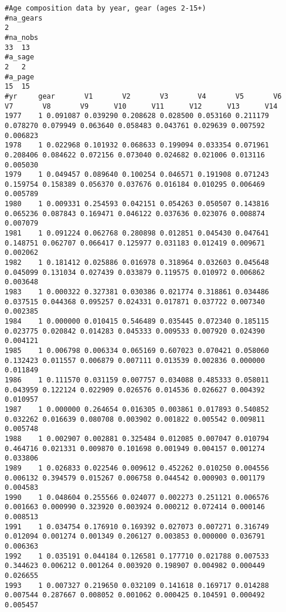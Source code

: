 \begin{landscape}
\begin{footnotesize}
\begin{verbatim}
#Age composition data by year, gear (ages 2-15+)
#na_gears
2
#na_nobs
33	13
#a_sage
2	2
#a_page
15	15
#yr 	gear       V1       V2       V3       V4       V5       V6       V7       V8       V9      V10      V11      V12      V13      V14
1977    1 0.091087 0.039290 0.208628 0.028500 0.053160 0.211179 0.078270 0.079949 0.063640 0.058483 0.043761 0.029639 0.007592 0.006823
1978    1 0.022968 0.101932 0.068633 0.199094 0.033354 0.071961 0.208406 0.084622 0.072156 0.073040 0.024682 0.021006 0.013116 0.005030
1979    1 0.049457 0.089640 0.100254 0.046571 0.191908 0.071243 0.159754 0.158389 0.056370 0.037676 0.016184 0.010295 0.006469 0.005789
1980    1 0.009331 0.254593 0.042151 0.054263 0.050507 0.143816 0.065236 0.087843 0.169471 0.046122 0.037636 0.023076 0.008874 0.007079
1981    1 0.091224 0.062768 0.280898 0.012851 0.045430 0.047641 0.148751 0.062707 0.066417 0.125977 0.031183 0.012419 0.009671 0.002062
1982    1 0.181412 0.025886 0.016978 0.318964 0.032603 0.045648 0.045099 0.131034 0.027439 0.033879 0.119575 0.010972 0.006862 0.003648
1983    1 0.000322 0.327381 0.030386 0.021774 0.318861 0.034486 0.037515 0.044368 0.095257 0.024331 0.017871 0.037722 0.007340 0.002385
1984    1 0.000000 0.010415 0.546489 0.035445 0.072340 0.185115 0.023775 0.020842 0.014283 0.045333 0.009533 0.007920 0.024390 0.004121
1985    1 0.006798 0.006334 0.065169 0.607023 0.070421 0.058060 0.132423 0.011557 0.006879 0.007111 0.013539 0.002836 0.000000 0.011849
1986    1 0.111570 0.031159 0.007757 0.034088 0.485333 0.058011 0.043959 0.122124 0.022909 0.026576 0.014536 0.026627 0.004392 0.010957
1987    1 0.000000 0.264654 0.016305 0.003861 0.017893 0.540852 0.032262 0.016639 0.080708 0.003902 0.001822 0.005542 0.009811 0.005748
1988    1 0.002907 0.002881 0.325484 0.012085 0.007047 0.010794 0.464716 0.021331 0.009870 0.101698 0.001949 0.004157 0.001274 0.033806
1989    1 0.026833 0.022546 0.009612 0.452262 0.010250 0.004556 0.006132 0.394579 0.015267 0.006758 0.044542 0.000903 0.001179 0.004583
1990    1 0.048604 0.255566 0.024077 0.002273 0.251121 0.006576 0.001663 0.000990 0.323920 0.003924 0.000212 0.072414 0.000146 0.008513
1991    1 0.034754 0.176910 0.169392 0.027073 0.007271 0.316749 0.012094 0.001274 0.001349 0.206127 0.003853 0.000000 0.036791 0.006363
1992    1 0.035191 0.044184 0.126581 0.177710 0.021788 0.007533 0.344623 0.006212 0.001264 0.003920 0.198907 0.004982 0.000449 0.026655
1993    1 0.007327 0.219650 0.032109 0.141618 0.169717 0.014288 0.007544 0.287667 0.008052 0.001062 0.000425 0.104591 0.000492 0.005457

\end{verbatim}
\end{footnotesize}
\end{landscape}

